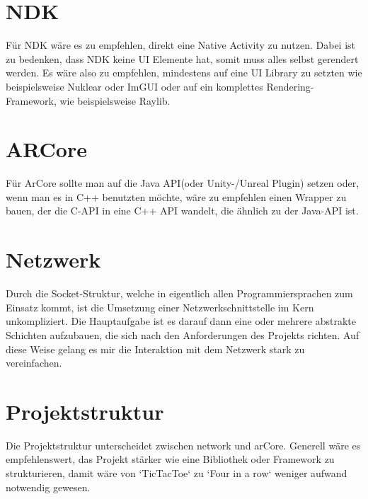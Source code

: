 \section{NDK}
Für NDK wäre es zu empfehlen, direkt eine Native Activity zu nutzen.
Dabei ist zu bedenken, dass NDK keine UI Elemente hat, somit muss alles selbst
gerendert werden. Es wäre also zu empfehlen, mindestens auf eine UI Library zu setzten
wie beispielsweise Nuklear oder ImGUI oder auf ein komplettes Rendering-Framework,
wie beispielsweise Raylib.


\section{ARCore}
Für ArCore sollte man auf die Java API(oder Unity-/Unreal Plugin) setzen oder,
wenn man es in C++ benutzten möchte, wäre zu empfehlen einen Wrapper zu bauen, der die
C-API in eine C++ API wandelt, die ähnlich zu der Java-API ist.


\section{Netzwerk}
Durch die Socket-Struktur, welche in eigentlich allen Programmiersprachen zum Einsatz kommt,
ist die Umsetzung einer Netzwerkschnittstelle im Kern unkompliziert. Die Hauptaufgabe ist es darauf
dann eine oder mehrere abstrakte Schichten aufzubauen, die sich nach den Anforderungen des Projekts
richten. Auf diese Weise gelang es mir die Interaktion mit dem Netzwerk stark zu vereinfachen.


\section{Projektstruktur}
Die Projektstruktur unterscheidet zwischen network und arCore. Generell wäre es empfehlenswert, das Projekt stärker wie eine Bibliothek oder Framework zu strukturieren, damit wäre von `TicTacToe` zu `Four in a row` weniger aufwand notwendig gewesen.
